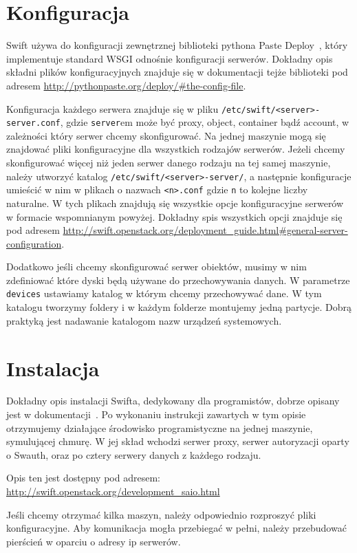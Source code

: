 \section{Konfiguracja}\label{sec:konfiguracja}

Swift używa do konfiguracji zewnętrznej biblioteki pythona Paste Deploy~\cite{paste_deploy}, który implementuje standard WSGI odnośnie konfiguracji serwerów. Dokładny opis składni plików konfiguracyjnych znajduje się w dokumentacji tejże biblioteki pod adresem \url{http://pythonpaste.org/deploy/#the-config-file}. 

Konfiguracja każdego serwera znajduje się w pliku \texttt{/etc/swift/<server>-server.conf}, gdzie \texttt{server}em może być proxy, object, container bądź account, w zależności który serwer chcemy skonfigurować. Na jednej maszynie mogą się znajdować pliki konfiguracyjne dla wszystkich rodzajów serwerów. Jeżeli chcemy skonfigurować więcej niż jeden serwer danego rodzaju na tej samej maszynie, należy utworzyć katalog \texttt{/etc/swift/<server>-server/}, a następnie konfiguracje umieścić w nim w plikach o nazwach \texttt{<n>.conf} gdzie \texttt{n} to kolejne liczby naturalne. W tych plikach znajdują się wszystkie opcje konfiguracyjne serwerów w formacie wspomnianym powyżej. Dokładny spis wszystkich opcji znajduje się pod adresem \url{http://swift.openstack.org/deployment_guide.html#general-server-configuration}.

Dodatkowo jeśli chcemy skonfigurować serwer obiektów, musimy w nim zdefiniować które dyski będą używane do przechowywania danych. W parametrze \texttt{devices} ustawiamy katalog w którym chcemy przechowywać dane. W tym katalogu tworzymy foldery i w każdym folderze montujemy jedną partycje. Dobrą praktyką jest nadawanie katalogom nazw urządzeń systemowych.

\section{Instalacja}\label{sec:instalacja}

Dokładny opis instalacji Swifta, dedykowany dla programistów, dobrze opisany jest w dokumentacji~\cite{swift_doc}. Po wykonaniu instrukcji zawartych w tym opisie otrzymujemy działające środowisko programistyczne na jednej maszynie, symulującej chmurę. W jej skład wchodzi serwer proxy, serwer autoryzacji oparty o Swauth, oraz po cztery serwery danych z każdego rodzaju.

Opis ten jest dostępny pod adresem: \url{http://swift.openstack.org/development_saio.html}

Jeśli chcemy otrzymać kilka maszyn, należy odpowiednio rozproszyć pliki konfiguracyjne. Aby komunikacja mogła przebiegać w pełni, należy przebudować pierścień w oparciu o adresy ip serwerów.



	

